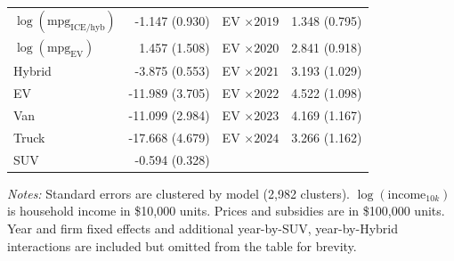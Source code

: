 \begin{table}[htbp]
\begin{threeparttable}
\begin{tabular}{@{}l r l r@{}}
\(\log(\text{mpg}_{\text{ICE/hyb}})\) & -1.147 (0.930) & EV \(\times 2019\) & 1.348 (0.795) \\
\(\log(\text{mpg}_{\text{EV}})\) & 1.457 (1.508) & EV \(\times 2020\) & 2.841 (0.918) \\
Hybrid & -3.875 (0.553) & EV \(\times 2021\) & 3.193 (1.029) \\
EV & -11.989 (3.705) & EV \(\times 2022\) & 4.522 (1.098) \\
Van & -11.099 (2.984) & EV \(\times 2023\) & 4.169 (1.167) \\
Truck & -17.668 (4.679) & EV \(\times 2024\) & 3.266 (1.162) \\
SUV & -0.594 (0.328) &  &  \\
\bottomrule
\end{tabular}

\begin{tablenotes}[flushleft]
\footnotesize
\item \textit{Notes:}
Standard errors are clustered by model (2{,}982 clusters). \(\log(\text{income}_{10k})\) is household
income in \$10,000 units. Prices and subsidies are in \$100,000 units. Year and firm fixed effects and additional year-by-SUV, year-by-Hybrid interactions are included but
omitted from the table for brevity.
\end{tablenotes}

\end{threeparttable}
\end{table}
